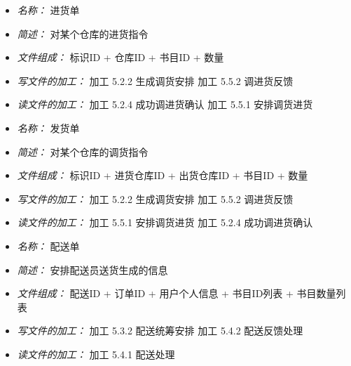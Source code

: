 \begin{itemize}
\item \textit{名称： }进货单
\item \textit{简述： } 对某个仓库的进货指令
\item \textit{文件组成： } 标识ID + 仓库ID + 书目ID + 数量 
\item \textit{写文件的加工： }加工 5.2.2 生成调货安排 加工 5.5.2 调进货反馈 
\item \textit{读文件的加工： }加工 5.2.4 成功调进货确认 加工 5.5.1 安排调货进货

\end{itemize}


\vspace{-1mm}


\begin{itemize}
\item \textit{名称： }发货单
\item \textit{简述： } 对某个仓库的调货指令
\item \textit{文件组成： }标识ID + 进货仓库ID + 出货仓库ID + 书目ID + 数量 
\item \textit{写文件的加工： }加工 5.2.2 生成调货安排 加工 5.5.2 调进货反馈 
\item \textit{读文件的加工： }加工 5.5.1 安排调货进货 加工 5.2.4 成功调进货确认

\end{itemize}


\vspace{-1mm}


\begin{itemize}
\item \textit{名称： }配送单
\item \textit{简述： } 安排配送员送货生成的信息
\item \textit{文件组成： } 配送ID + 订单ID + 用户个人信息 + 书目ID列表 + 书目数量列表 
\item \textit{写文件的加工： }加工 5.3.2 配送统筹安排 加工 5.4.2 配送反馈处理 
\item \textit{读文件的加工： }加工 5.4.1 配送处理

\end{itemize}


\vspace{-1mm}


